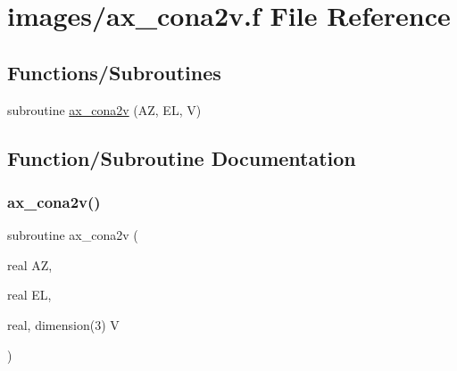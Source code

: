 \hypertarget{ax__cona2v_8f}{}\section{images/ax\+\_\+cona2v.f File Reference}
\label{ax__cona2v_8f}
\subsection*{Functions/\+Subroutines}
\begin{DoxyCompactItemize}
\item 
subroutine \hyperlink{ax__cona2v_8f_a98dd70b6a9316b18b73fd35459cf0bf4}{ax\+\_\+cona2v} (AZ, EL, V)
\end{DoxyCompactItemize}


\subsection{Function/\+Subroutine Documentation}
\mbox{\label{ax__cona2v_8f_a98dd70b6a9316b18b73fd35459cf0bf4}} 
\subsubsection{\texorpdfstring{ax\+\_\+cona2v()}{ax\_cona2v()}}
{\footnotesize\ttfamily subroutine ax\+\_\+cona2v (\begin{DoxyParamCaption}\item[{real}]{AZ,  }\item[{real}]{EL,  }\item[{real, dimension(3)}]{V }\end{DoxyParamCaption})}

